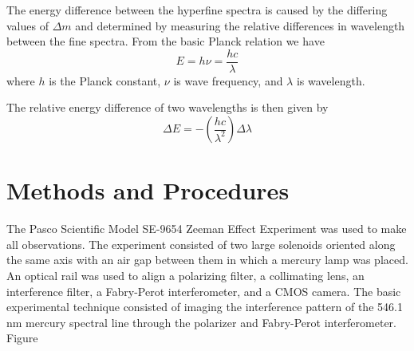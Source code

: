 \documentclass[twocolumn]{article}
\begin{document}
		The energy difference between the hyperfine spectra is caused by the differing values of $\Delta m$ and determined by measuring the relative differences in wavelength between the fine spectra.
		From the basic Planck relation we have
		\begin{equation}
			E = h\nu = \frac{hc}{\lambda}
		\end{equation}
		where $h$ is the Planck constant, $\nu$ is wave frequency, and $\lambda$ is wavelength.
		
		The relative energy difference of two wavelengths is then given by
		\begin{equation}
			\Delta E = -\left(\frac{hc}{\lambda^2}\right) \Delta \lambda
		\end{equation}
	

		
\section{Methods and Procedures}
	The Pasco Scientific Model SE-9654 Zeeman Effect Experiment was used to make all observations.
	The experiment consisted of two large solenoids oriented along the same axis with an air gap between them in which a mercury lamp was placed.
	An optical rail was used to align a polarizing filter, a collimating lens, an interference filter, a Fabry-Perot interferometer, and a CMOS camera.
	The basic experimental technique consisted of imaging the interference pattern of the 546.1 nm mercury spectral line through the polarizer and Fabry-Perot interferometer.
	Figure 
	
\end{document}
